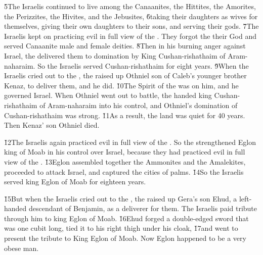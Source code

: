 \v{5}The Israelis continued to live among the Canaanites, the Hittites, the Amorites, the Perizzites, the Hivites, and the Jebusites, \v{6}taking their daughters as wives for themselves, giving their own daughters to their sons, and serving their gods. \v{7}The Israelis kept on practicing evil in full view of the . They forgot the  their God and served Canaanite male and female deities. \v{8}Then in his burning anger against Israel, the  delivered them to domination by King Cushan-rishathaim of Aram-naharaim. So the Israelis served Cushan-rishathaim for eight years. \v{9}When the Israelis cried out to the , the  raised up Othniel son of Caleb's younger brother Kenaz, to deliver them, and he did. \v{10}The Spirit of the  was on him, and he governed Israel. When Othniel went out to battle, the  handed king Cushan-rishathaim of Aram-naharaim into his control, and Othniel's domination of Cushan-rishathaim was strong. \v{11}As a result, the land was quiet for 40 years. Then Kenaz' son Othniel died.

\v{12}The Israelis again practiced evil in full view of the . So the  strengthened Eglon king of Moab in his control over Israel, because they had practiced evil in full view of the . \v{13}Eglon assembled together the Ammonites and the Amalekites, proceeded to attack Israel, and captured the cities of palms. \v{14}So the Israelis served king Eglon of Moab for eighteen years.

\v{15}But when the Israelis cried out to the , the  raised up Gera's son Ehud, a left-handed descendant of Benjamin, as a deliverer for them. The Israelis paid tribute through him to king Eglon of Moab. \v{16}Ehud forged a double-edged sword that was one cubit long, tied it to his right thigh under his cloak, \v{17}and went to present the tribute to King Eglon of Moab. Now Eglon happened to be a very obese man.


